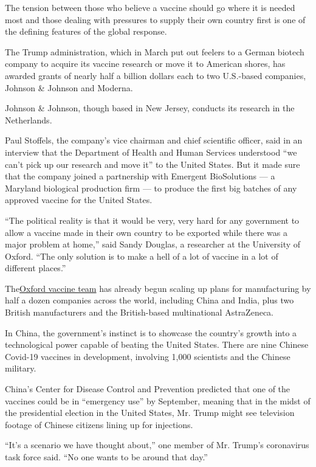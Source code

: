 The tension between those who believe a vaccine should go where it is
needed most and those dealing with pressures to supply their own country
first is one of the defining features of the global response.

The Trump administration, which in March put out feelers to a German
biotech company to acquire its vaccine research or move it to American
shores, has awarded grants of nearly half a billion dollars each to two
U.S.-based companies, Johnson \& Johnson and Moderna.

Johnson \& Johnson, though based in New Jersey, conducts its research in
the Netherlands.

Paul Stoffels, the company's vice chairman and chief scientific officer,
said in an interview that the Department of Health and Human Services
understood ``we can't pick up our research and move it'' to the United
States. But it made sure that the company joined a partnership with
Emergent BioSolutions --- a Maryland biological production firm --- to
produce the first big batches of any approved vaccine for the United
States.

``The political reality is that it would be very, very hard for any
government to allow a vaccine made in their own country to be exported
while there was a major problem at home,'' said Sandy Douglas, a
researcher at the University of Oxford. ``The only solution is to make a
hell of a lot of vaccine in a lot of different places.''

The\href{https://www.nytimes3xbfgragh.onion/2020/04/27/world/europe/coronavirus-vaccine-update-oxford.html}{Oxford
vaccine team} has already begun scaling up plans for manufacturing by
half a dozen companies across the world, including China and India, plus
two British manufacturers and the British-based multinational
AstraZeneca.

In China, the government's instinct is to showcase the country's growth
into a technological power capable of beating the United States. There
are nine Chinese Covid-19 vaccines in development, involving 1,000
scientists and the Chinese military.

China's Center for Disease Control and Prevention predicted that one of
the vaccines could be in ``emergency use'' by September, meaning that in
the midst of the presidential election in the United States, Mr. Trump
might see television footage of Chinese citizens lining up for
injections.

``It's a scenario we have thought about,'' one member of Mr. Trump's
coronavirus task force said. ``No one wants to be around that day.''

